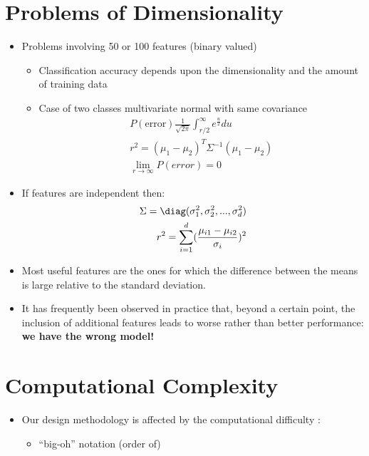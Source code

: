 \documentclass[11pt]{article}
\begin{document}
\section{Problems of Dimensionality} %
\cite[11]{slidesChapter3Part2}
\begin{itemize}
	\item  Problems involving 50 or 100 features (binary valued)
	\begin{itemize}
		\item Classification accuracy depends upon the dimensionality and the amount of training data
		\item Case of two classes multivariate normal with same covariance
		\begin{eqnarray}
		P(\textrm{error}) \frac{1}{\sqrt{2\pi}} \int _{r/2}^{\infty} e^{\frac{u}{2}} du \\
		r^2 = (\mu _1 - \mu_2)^T \Sigma^{-1} (\mu _1 - \mu_2) \\
		\lim _{r \to \infty} P(error) = 0 
		\end{eqnarray}
	\end{itemize}
	\item If features are independent then:  
	\begin{eqnarray}
		\Sigma = \diag ( \sigma_1 ^2, \sigma_2^2 , ..., \sigma_d ^2) \\
		r^2 = \sum _{i=1}^d (\frac{\mu _{i1} - \mu_{i2}}{\sigma_i})^2
	\end{eqnarray}
	\item Most useful features are the ones for which the difference between the means is large relative to the standard deviation.
	\item It has frequently been observed in practice that, beyond a certain point, the inclusion of additional features leads to worse rather than better performance:  \textbf{we have the wrong model!}
	
\end{itemize}


\section{Computational Complexity}

\begin{itemize}
	\item Our design methodology is affected by the computational difficulty : 
	\begin{itemize}
		\item ``big-oh'' notation (order of)
	\end{itemize}
	
\end{itemize}
\end{document}
